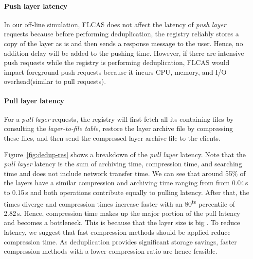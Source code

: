 \paragraph{Push layer latency}

In our off-line simulation,
FLCAS does not affect the latency of \emph{push layer} requests
because before performing deduplication, the registry reliably stores
a copy of the layer as is and then sends a response message to the user.
%
Hence, no addition delay will be added to the pushing time. 
%
However, 
if there are intensive push requests while the registry is performing deduplication,
FLCAS would impact foreground push requests because it incurs 
CPU, memory, and I/O overhead(similar to pull requests).

\paragraph{Pull layer latency} 

For a \emph{pull layer} requests, the registry will first fetch 
all its containing files by consulting the \emph{layer-to-file table}, 
restore the layer archive file by compressing these files, and
then send the compressed layer archive file to the clients.

Figure~\ref{fig:dedup-res} shows a breakdown of the \emph{pull layer}
latency.
%
Note that the \emph{pull layer} latency is the sum of archiving time,
compression time, and searching time and does not include network transfer
time. 
%
We can see that around 55\% of the layers have a similar compression and archiving
time ranging from from 0.04\,s to 0.15\,s and both operations contribute equally
to pulling latency.
%
%
After that, the times diverge and compression times increase faster with an
80\textsuperscript{ts} percentile of 2.82\,s. Hence, compression time makes
up the major portion of the pull latency and becomes a bottleneck.
This is because that the layer size is big
.
%
%
To reduce latency, we suggest that fast compression methods should be applied reduce
compression time. As deduplication provides significant storage savings, faster compression
methods with a lower compression ratio are hence feasible.

